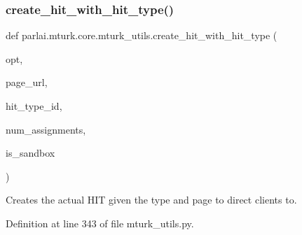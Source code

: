 \mbox{\label{namespaceparlai_1_1mturk_1_1core_1_1mturk__utils_a2e92dde4f8ec17749f22f83b6d362d4f}} 
\subsubsection{\texorpdfstring{create\+\_\+hit\+\_\+with\+\_\+hit\+\_\+type()}{create\_hit\_with\_hit\_type()}}
{\footnotesize\ttfamily def parlai.\+mturk.\+core.\+mturk\+\_\+utils.\+create\+\_\+hit\+\_\+with\+\_\+hit\+\_\+type (\begin{DoxyParamCaption}\item[{}]{opt,  }\item[{}]{page\+\_\+url,  }\item[{}]{hit\+\_\+type\+\_\+id,  }\item[{}]{num\+\_\+assignments,  }\item[{}]{is\+\_\+sandbox }\end{DoxyParamCaption})}

\begin{DoxyVerb}Creates the actual HIT given the type and page to direct clients to.
\end{DoxyVerb}
 

Definition at line 343 of file mturk\+\_\+utils.\+py.


